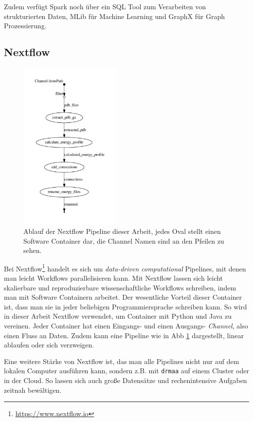 Zudem verfügt Spark noch über ein SQL Tool zum Verarbeiten von strukturierten Daten, MLib für Machine Learning und GraphX für Graph Prozessierung.



\newpage
\subsection{Nextflow}

\begin{figure}
    \centering
    \includegraphics[width=0.45\textwidth]{images/flowchart.pdf}
    \caption{Ablauf der Nextflow Pipeline dieser Arbeit, jedes Oval stellt einen Software Container dar, die Channel Namen sind an den Pfeilen zu sehen.}
    \label{fig:nextflow_pipe}
\end{figure}
Bei Nextflow\footnote{\url{https://www.nextflow.io}} handelt es sich um \emph{data-driven computational} Pipelines, mit denen man leicht Workflows parallelisieren kann. Mit Nextflow lassen sich leicht skalierbare und reproduzierbare wissenschaftliche Workflows schreiben, indem man mit Software Containern arbeitet. Der wesentliche Vorteil dieser Container ist, dass man sie in jeder beliebigen Programmiersprache schreiben kann. So wird in dieser Arbeit Nextflow verwendet, um Container mit Python und Java zu vereinen. Jeder Container hat einen Eingangs- und einen Ausgangs- \emph{Channel}, also einen Fluss an Daten. Zudem kann eine Pipeline wie in \ac{Abb} \ref{fig:nextflow_pipe} dargestellt, linear ablaufen oder sich verzweigen.

Eine weitere Stärke von Nextflow ist, das man alle Pipelines nicht nur auf dem lokalen Computer ausführen kann, sondern z.B. mit \texttt{drmaa} auf einem Cluster oder in der Cloud. So lassen sich auch große Datensätze und rechenintensive Aufgaben zeitnah bewältigen.



